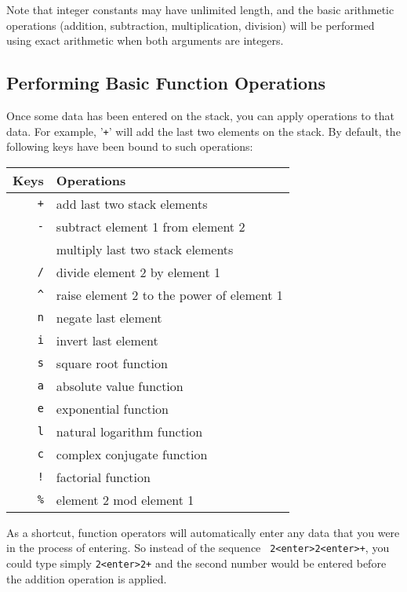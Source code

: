 \documentclass[11pt,notitlepage]{article}
\begin{document}
Note that integer constants may have unlimited length, and the basic arithmetic
operations (addition, subtraction, multiplication, division) will be performed
using exact arithmetic when both arguments are integers.

\subsection{Performing Basic Function Operations}
\label{functionops}
Once some data has been entered on the stack, you can apply operations to that
data.  For example, '{\tt +}' will add the last two elements on the stack.  By
default, the following keys have been bound to such operations:
\begin{center}
   \begin{tabular}[t]{|r|l|}
      \hline Keys & Operations \\
      \hline
      {\tt +} & add last two stack elements \\
      {\tt -} & subtract element 1 from element 2 \\
      {\tt *} & multiply last two stack elements \\
      {\tt /} & divide element 2 by element 1 \\
      {\tt \^{}} & raise element 2 to the power of element 1 \\
      {\tt n} & negate last element \\
      {\tt i} & invert last element \\
      {\tt s} & square root function \\
      {\tt a} & absolute value function \\
      {\tt e} & exponential function \\
      {\tt l} & natural logarithm function \\
      {\tt c} & complex conjugate function \\
      {\tt !} & factorial function  \\
      {\tt \%} & element 2 mod element 1 \\
      \hline
   \end{tabular}
\end{center}

As a shortcut, function operators will automatically enter any data that you
were in the process of entering.  So instead of the sequence {\tt
2<enter>2<enter>+}, you could type simply {\tt 2<enter>2+} and the second number
would be entered before the addition operation is applied.
\end{document}
